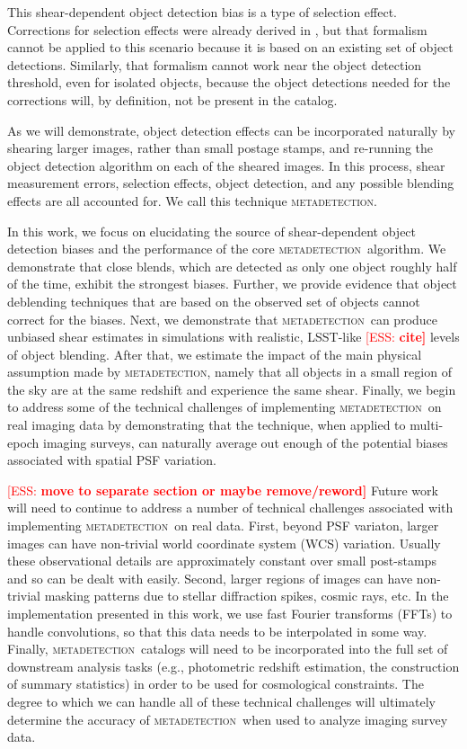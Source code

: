 \documentclass[fleqn,useAMS,usenatbib]{mnras}
\newcommand{\ess}[1]{\textcolor{red}{[ESS: \bf #1]}}
\newcommand{\mdet}{\textsc{metadetection}}
\begin{document}
This shear-dependent object detection bias is a type of selection effect.
Corrections for selection effects were already derived in
\cite{SheldonMcal2017},  but that formalism cannot be applied to this scenario
because it is based on an existing set of object detections.  Similarly, that
formalism cannot work near the object detection threshold, even for isolated
objects, because the object detections needed for the corrections will, by definition,
not be present in the catalog.

As we will demonstrate, object detection effects can be incorporated naturally
by shearing larger images, rather than small postage stamps, and re-running the
object detection algorithm on each of the sheared images. In this process,
shear measurement errors, selection effects, object detection, and any possible
blending effects are all accounted for.  We call this technique \mdet.

In this work, we focus on elucidating the source of shear-dependent object detection
biases and the performance of the core \mdet\ algorithm. We demonstrate that
close blends, which are detected as only one object roughly half of the time,
exhibit the strongest biases. Further, we provide evidence that object
deblending techniques that are based on the observed set of objects cannot
correct for the biases. Next, we demonstrate that \mdet\ can produce unbiased
shear estimates in simulations with realistic, LSST-like \ess{cite} levels of object
blending. After that, we estimate the impact of the main physical assumption
made by \mdet, namely that all objects in a small region of the sky are at the
same redshift and experience the same shear. Finally, we begin to address some
of the technical challenges of implementing \mdet\ on real imaging data by
demonstrating that the technique, when applied to multi-epoch imaging surveys,
can naturally average out enough of the potential biases associated with
spatial PSF variation.

\ess{move to separate section or maybe remove/reword}
Future work will need to continue to address a number of technical challenges associated
with implementing \mdet\ on real data. First, beyond PSF variaton, larger images
can have non-trivial world coordinate system (WCS) variation. Usually these observational
details are approximately constant over small post-stamps and so can be dealt
with easily. Second, larger regions of images can have non-trivial masking
patterns due to stellar diffraction spikes, cosmic rays, etc. In the
implementation presented in this work, we use fast Fourier transforms (FFTs) to
handle convolutions, so that this data needs to be interpolated in some way.
Finally, \mdet\ catalogs will need to be incorporated into the full set of
downstream analysis tasks (e.g., photometric redshift estimation, the
construction of summary statistics) in order to be used for cosmological
constraints. The degree to which we can handle all of these technical
challenges will ultimately determine the accuracy of \mdet\ when used to analyze
imaging survey data.
\end{document}
